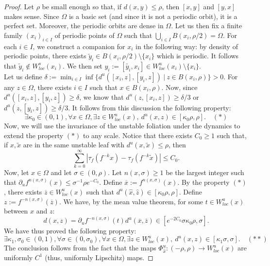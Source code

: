 \documentclass[a4paper]{article}
\theoremstyle{definition}
\begin{document}
\begin{proof}
Let $\rho$ be small enough so that, if $d(x,y) \leq \rho$, then $[x,y]$ and $[y,x]$ makes sense. Since $\Omega$ is a basic set (and since it is not a periodic orbit), it is a perfect set. Moreover, the periodic orbits are dense in $\Omega$. Let us then fix a finite family $(x_i)_{i \in I}$ of periodic points of $\Omega$ such that $\bigcup_{i \in I} B(x_i,\rho/2) = \Omega$. For each $i \in I$, we construct a companion for $x_i$ in the following way: by density of periodic points, there exists $\tilde{y}_i \in B(x_i,\rho/2) \setminus \{x_i\}$ which is periodic. It follows that $\tilde{y}_i \notin W^s_{loc}(x_i)$. We then set $y_i := [\tilde{y_i},x_i] \in W^u_{loc}(x_i) \setminus \{x_i\}$. \\

Let us define $\delta := \min_{i \in I} \inf\{ d^u( [x_i,z],[y_i,z] ) \ | \ z \in B(x_i,\rho)  \}> 0$. For any $z \in \Omega$, there exists $i \in I$ such that $x \in B(x_i,\rho)$. Now, since $d^u( [x_i,z],[y_i,z] ) \geq \delta$, we know that $d^u(z,[x_i,z]) \geq \delta/3$ or $d^u(z,[y_i,z]) \geq \delta/3$. It follows from this discussion the following property:
$$ \exists \kappa_0 \in (0,1), \forall x \in \Omega, \exists z \in W^u_{loc}(x), \ d^u(x,z) \in [\kappa_0 \rho, \rho]. \quad (*) $$
Now, we will use the invariance of the unstable foliation under the dynamics to extend the property $(*)$ to any scale.
Notice that there exists $C_0 \geq 1$ such that, if $x,\tilde{x}$ are in the same unstable leaf with $d^u(x,\tilde{x}) \leq \rho$, then
$$ \sum_{k=0}^\infty |\tau_f( f^{-k} x) - \tau_f( f^{-k} \tilde{x}) | \leq C_0 .$$
Now, let $x \in \Omega$ and let $\sigma \in (0,\rho)$. Let $n(x,\sigma) \geq 1$ be the largest integer such that $\partial_u f^{n(x,\sigma)}(x) \leq \sigma^{-1} \rho e^{-C_0}$. Define $\overline{x} := f^{n(x,\sigma)}(x)$. By the property $(*)$, there exists $\overline{z} \in W^u_{loc}(x)$ such that $d^u(\widehat{x},\widehat{z}) \in [\kappa_0 \rho,\rho]$. Define $z := f^{-n(x,\sigma)}(\overline{z})$. We have, by the mean value theorem, for some $t \in W^u_{loc}(x)$ between $x$ and $z$:
$$ d(x,z) = \partial_u f^{-n(x,\sigma)}(t) d^u(\overline{x},\overline{z}) \in [e^{-2C_0} \sigma \kappa_0 \rho, \sigma] .$$
We have thus proved the following property:
$$ \exists \kappa_1,\sigma_0 \in (0,1), \forall \sigma \in (0,\sigma_0), \forall x \in \Omega, \exists z \in W^u_{loc}(x), \ d^u(x,z) \in [\kappa_1 \sigma, \sigma]. \quad (**) $$
The conclusion follows from the fact that the maps $\Phi_{\widehat{x}}^u : (-\rho,\rho) \rightarrow W^u_{loc}(x)$ are uniformly $C^{1}$ (thus, uniformly Lipschitz) maps. 
\end{proof}
\end{document}
